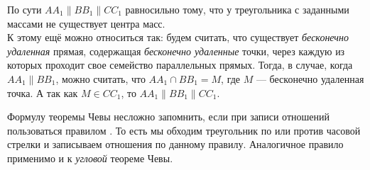 \documentclass[14pt]{extarticle}
\theoremstyle{definition}
\theoremstyle{theorem}
\newtheorem*{remark}{\textup{Комментарий}}
\renewenvironment{remark}
    {\noindent\textbf{Комментарий.}}
\newenvironment{note}
    {\noindent {\normalfont\fontsize{14}{14}\textbf{\textit{Примечание.}}}}
\begin{document}
\begin{note}
По сути \(AA_1 \parallel BB_1 \parallel CC_1\) равносильно тому, что у
треугольника с заданными массами не существует центра масс.\\ 
К этому ещё можно относиться так: будем считать, что существует 
\textit{бесконечно удаленная} прямая, содержащая \textit{бесконечно удаленные}
точки, через каждую из которых проходит свое семейство параллельных прямых.
Тогда, в случае, когда  \(AA_1 \parallel BB_1\), можно считать, что
\(AA_1 \cap BB_1 = M\), где \(M\) --- бесконечно удаленная точка. А так как
\(M \in CC_1\), то \(AA_1 \parallel BB_1 \parallel CC_1\).

Формулу теоремы Чевы несложно запомнить, если при записи отношений
пользоваться правилом .
То есть мы обходим треугольник по или против часовой стрелки и записываем
отношения по данному правилу. Аналогичное правило применимо и к \textit{угловой}
теореме Чевы.\\
\end{note}





\end{document}
